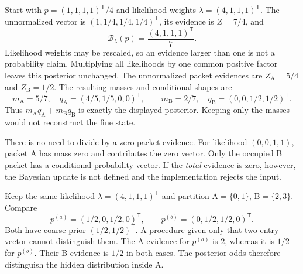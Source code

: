 Start with $p=(1,1,1,1)^{\mathsf T}/4$ and likelihood weights $\lambda=(4,1,1,1)^{\mathsf T}$. The unnormalized vector is $(1,1/4,1/4,1/4)^{\mathsf T}$, its evidence is $Z=7/4$, and
\[
\mathcal B_\lambda(p)=\frac{(4,1,1,1)^{\mathsf T}}7.
\]
Likelihood weights may be rescaled, so an evidence larger than one is not a probability claim. Multiplying all likelihoods by one common positive factor leaves this posterior unchanged.
The unnormalized packet evidences are $Z_{\mathrm A}=5/4$ and $Z_{\mathrm B}=1/2$. The resulting masses and conditional shapes are
\[
m_{\mathrm A}=5/7,\quad q_{\mathrm A}=(4/5,1/5,0,0)^{\mathsf T},
\qquad m_{\mathrm B}=2/7,\quad q_{\mathrm B}=(0,0,1/2,1/2)^{\mathsf T}.
\]
Thus $m_{\mathrm A}q_{\mathrm A}+m_{\mathrm B}q_{\mathrm B}$ is exactly the displayed posterior. Keeping only the masses would not reconstruct the fine state.

There is no need to divide by a zero packet evidence. For likelihood $(0,0,1,1)$, packet A has mass zero and contributes the zero vector. Only the occupied B packet has a conditional probability vector. If the \emph{total} evidence is zero, however, the Bayesian update is not defined and the implementation rejects the input.

Keep the same likelihood $\lambda=(4,1,1,1)^{\mathsf T}$ and partition A$=\{0,1\}$, B$=\{2,3\}$. Compare
\[
p^{(a)}=(1/2,0,1/2,0)^{\mathsf T},\qquad
p^{(b)}=(0,1/2,1/2,0)^{\mathsf T}.
\]
Both have coarse prior $(1/2,1/2)^{\mathsf T}$. A procedure given only that two-entry vector cannot distinguish them.
The A evidence for $p^{(a)}$ is $2$, whereas it is $1/2$ for $p^{(b)}$. Their B evidence is $1/2$ in both cases. The posterior odds therefore distinguish the hidden distribution inside A.

